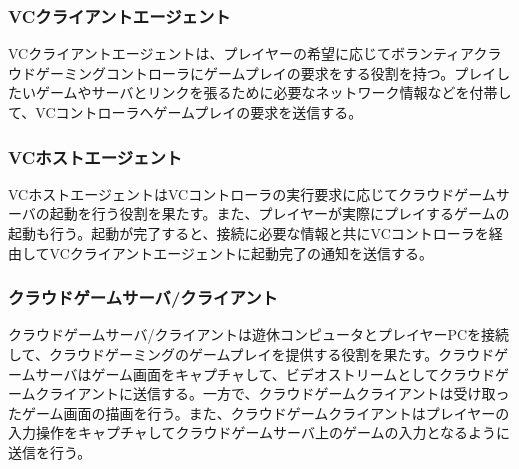 
\subsubsection{VCクライアントエージェント}
VCクライアントエージェントは、プレイヤーの希望に応じてボランティアクラウドゲーミングコントローラにゲームプレイの要求をする役割を持つ。プレイしたいゲームやサーバとリンクを張るために必要なネットワーク情報などを付帯して、VCコントローラへゲームプレイの要求を送信する。

\subsubsection{VCホストエージェント}
VCホストエージェントはVCコントローラの実行要求に応じてクラウドゲームサーバの起動を行う役割を果たす。また、プレイヤーが実際にプレイするゲームの起動も行う。起動が完了すると、接続に必要な情報と共にVCコントローラを経由してVCクライアントエージェントに起動完了の通知を送信する。

\subsubsection{クラウドゲームサーバ/クライアント}
クラウドゲームサーバ/クライアントは遊休コンピュータとプレイヤーPCを接続して、クラウドゲーミングのゲームプレイを提供する役割を果たす。クラウドゲームサーバはゲーム画面をキャプチャして、ビデオストリームとしてクラウドゲームクライアントに送信する。一方で、クラウドゲームクライアントは受け取ったゲーム画面の描画を行う。また、クラウドゲームクライアントはプレイヤーの入力操作をキャプチャしてクラウドゲームサーバ上のゲームの入力となるように送信を行う。

